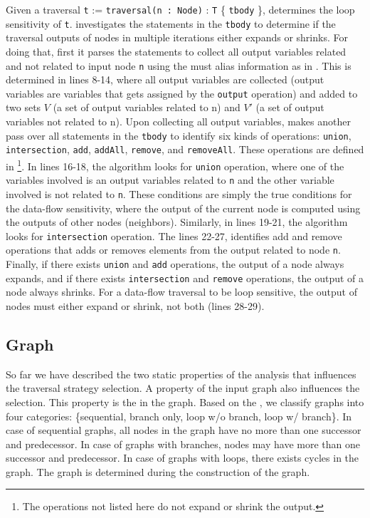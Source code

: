 Given a traversal \lstinline|t| := \lstinline|traversal(n : Node)| :
\lstinline|T| \{ \lstinline|tbody| \},  determines
the loop sensitivity of \lstinline|t|.
 investigates the statements in the
\lstinline|tbody| to determine if the traversal outputs of nodes in multiple
iterations either expands or shrinks. For doing that, first it parses the
statements to collect all output variables related and not related to input node
\lstinline|n| using the must alias information as in
. This is determined in lines 8-14, where all
output variables are collected (output variables are variables that gets
assigned by the \lstinline|output| operation) and added to two sets $V$ (a set
of output variables related to n) and $V'$ (a set of output variables not
related to n).
Upon collecting all output variables,  makes
another pass over all statements in the \lstinline|tbody| to identify six kinds
of operations: \lstinline|union|, \lstinline|intersection|, \lstinline|add|,
\lstinline|addAll|, \lstinline|remove|, and \lstinline|removeAll|. These
operations are defined in \footnote{The operations not
listed here do not expand or shrink the output.}.
In lines 16-18, the algorithm looks for \lstinline|union| operation, where one
of the variables involved is an output variables related to \lstinline|n| and
the other variable involved is not related to \lstinline|n|. These conditions
are simply the true conditions for the data-flow sensitivity, where the output
of the current node is computed using the outputs of other nodes (neighbors).
Similarly, in lines 19-21, the algorithm looks for \lstinline|intersection|
operation. The lines 22-27, identifies add and remove operations that adds or
removes elements from the output related to node \lstinline|n|. Finally, if
there exists \lstinline|union| and \lstinline|add| operations, the output of a
node always expands, and if there exists \lstinline|intersection| and
\lstinline|remove| operations, the output of a node always shrinks. For a
data-flow traversal to be loop sensitive, the output of nodes must either expand
or shrink, not both (lines 28-29). 

\subsection{Graph \Graphprop}
So far we have described the two static properties of the analysis that
influences the traversal strategy selection. A property of the input graph
also influences the selection. This property is the \graphprop{} in the
graph. Based on the \graphprop{}, we classify graphs into four categories:
\{sequential, branch only, loop w/o branch, loop w/ branch\}. In case of
sequential graphs, all nodes in the graph have no more than one successor and
predecessor. In case of graphs with branches, nodes may have more than one
successor and predecessor. In case of graphs with loops, there exists cycles in
the graph. The graph \graphprop{} is determined during the construction of the
graph.

